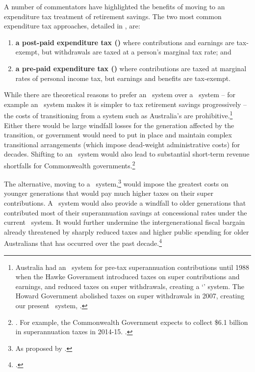 A number of commentators have highlighted the benefits of moving to an expenditure tax treatment of retirement savings.  The two most common expenditure tax approaches, detailed in , are: 
\begin{enumerate}
\item \textbf{a post-paid expenditure tax (\EET)} where contributions and earnings are tax-exempt, but withdrawals are taxed at a person's marginal tax rate; and
\item \textbf{a pre-paid expenditure tax (\TEE)} where contributions are taxed at marginal rates of personal income tax, but earnings and benefits are tax-exempt. 
\end{enumerate}

While there are theoretical reasons to prefer an \EET\ system over a \TEE\ system – for example an \EET\ system makes it is simpler to tax retirement savings progressively – the costs of transitioning from a system such as Australia’s are prohibitive.\footnote{Australia had an \EET\ system for pre-tax superannuation contributions until 1988 when the Hawke Government introduced taxes on super contributions and earnings, and reduced taxes on super withdrawals, creating a `\ttt' system. The Howard Government abolished taxes on super withdrawals in 2007, creating our present \ttE\ system, \textcite[][44]{Treasury2008RetirementIncomeConsultPaper}.} Either there would be large windfall losses for the generation affected by the transition, or government would need to put in place and maintain complex transitional arrangements (which impose dead-weight administrative costs) for decades. Shifting to an \EET\ system would also lead to substantial short-term revenue shortfalls for Commonwealth governments.\footnote{\textcite{Mercer2015SubmissionToReThink}. For example, the Commonwealth Government expects to collect \$6.1 billion in superannuation taxes in 2014-15. \textcite[][5]{Treasury2015FinalBudgetOutcome1415}.}

The alternative, moving to a \TEE\ system,\footnote{As proposed by \textcites{MaddockKing2015}{Freebairn2015a}.} would impose the greatest costs on younger generations that would pay much higher taxes on their super contributions. A \TEE\ system would also provide a windfall to older generations that contributed most of their superannuation savings at concessional rates under the current \ttE\ system. It would further undermine the intergenerational fiscal bargain already threatened by sharply reduced taxes and higher public spending for older Australians that has occurred over the past decade.\footcite[][2]{DaleyWoodWeidmannEtAl2014} 

